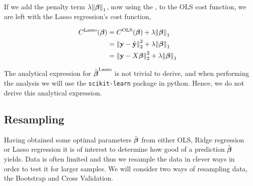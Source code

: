 If we add the penalty term $\lambda \norm{\boldsymbol{\beta}}_1$, now using the \footnotemark, to the OLS cost function, we are left with the Lasso regression's cost function,

\begin{align*}
    C^\text{Lasso}(\boldsymbol{\beta})  &= C^\text{OLS}(\boldsymbol{\beta}) + \lambda \norm{\boldsymbol{\beta}}_1 \\
    &= \norm{\mathbf{y}-\tilde{\mathbf{y}}}_2^{2}  + \lambda \norm{\boldsymbol{\beta}}_{1} \\
    &= \norm{\mathbf{y}-X\boldsymbol{\beta}}_2^{2} + \lambda \norm{\boldsymbol{\beta}}_{1}
\end{align*}

The analytical expression for $\hat{\boldsymbol{\beta}}^{\text{Lasso}}$ is not trivial to derive, and when performing the analysis we will use the \texttt{scikit-learn} package in python. Hence, we do not derive this analytical expression. 

\subsection{Resampling}\label{sec:resampling}
Having obtained some optimal parameters $\hat{\boldsymbol{\beta}}$ from either OLS, Ridge regression or Lasso regression it is of interest to determine how good of a prediction $\hat{\boldsymbol{\beta}}$ yields. Data is often limited and thus we resample the data in clever ways in order to test it for larger samples. We will consider two ways of resampling data, the Bootstrap and Cross Validation. 

